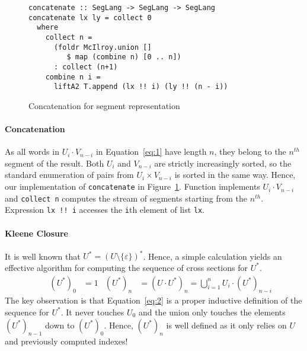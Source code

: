\begin{figure}[tbp]
\begin{lstlisting}
concatenate :: SegLang -> SegLang -> SegLang
concatenate lx ly = collect 0
  where
    collect n =
      (foldr McIlroy.union []
         $ map (combine n) [0 .. n])
      : collect (n+1)
    combine n i =
      liftA2 T.append (lx !! i) (ly !! (n - i))
\end{lstlisting}
\vspace{-\baselineskip}
  \caption{Concatenation for segment representation}
  \label{fig:concatenate-with-segments}
\end{figure}

\paragraph{Concatenation}
As all
words in $U_i \cdot V_{n-i}$ in Equation~\eqref{eq:1} have length $n$, they belong to the
$n^{th}$ segment of the result. Both $U_i$ and
$V_{n-i}$ are strictly increasingly sorted, so the standard enumeration of pairs from
$U_i \times
V_{n-i}$ is sorted in the same way. Hence, our implementation of
\lstinline{concatenate} in Figure~\ref{fig:concatenate-with-segments}.  Function  implements $U_i
\cdot V_{n-i}$ and  \lstinline{collect n} computes the stream of segments starting from
the $n^{th}$. Expression \lstinline{lx !! i} accesses the \lstinline{i}th element of
list \lstinline{lx}.  


\paragraph{Kleene Closure}
It is well known that $U^* = (U\setminus\{\varepsilon\})^*$. 
Hence, a simple calculation yields an
effective algorithm for computing the sequence of cross sections for $U^*$. 
\begin{align}
  \label{eq:2}
  &%
  & (U^*)_0 &= 1
  & (U^*)_n &= (U \cdot U^*)_n = \bigcup_{i=1}^n U_i\cdot (U^*)_{n-i}
\end{align}
The key observation is that Equation~\eqref{eq:2} is a proper
inductive definition of the sequence for $U^*$. It never touches $U_0$ and the union
only touches the elements $(U^*)_{n-1}$ down to $(U^*)_0$. Hence, $(U^*)_n$ is well
defined as it only relies on $U$ and previously computed indexes!

